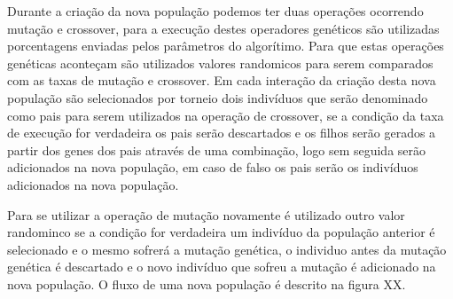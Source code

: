 Durante a criação da nova população podemos ter duas operações ocorrendo mutação e crossover, para a execução destes operadores genéticos são utilizadas porcentagens enviadas pelos parâmetros do algorítimo. Para que estas operações genéticas aconteçam são utilizados valores randomicos para serem comparados com as taxas de mutação e crossover. Em cada interação da criação desta nova população são selecionados por torneio dois indivíduos que serão denominado como pais para serem utilizados na operação de crossover, se a condição da taxa de execução for verdadeira os pais serão descartados e os filhos serão gerados a partir dos genes dos pais através de uma combinação, logo sem seguida serão adicionados na nova população, em caso de falso os pais serão os indivíduos adicionados na nova população.\par

Para se utilizar a operação de mutação novamente é utilizado outro valor randominco se a condição for verdadeira um indivíduo da população anterior é selecionado e o mesmo sofrerá a mutação genética, o individuo antes da mutação genética é descartado e o novo indivíduo que sofreu a mutação é adicionado na nova população. O fluxo de uma nova população é descrito na figura XX.\par

